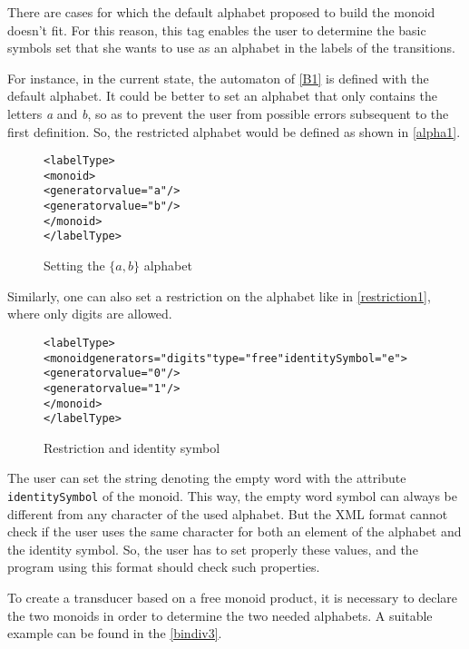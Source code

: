 \documentclass[a4paper]{article}
\newcommand{\xattr}[1]{\texttt{#1}}
\begin{document}
There are cases for which the default alphabet proposed to build the
monoid doesn't fit. For this reason, this tag enables the user to
determine the basic symbols set that she wants to use as an alphabet
in the labels of the transitions.

For instance, in the current state, the automaton of \autoref{B1} is
defined with the default alphabet. It could be better to set an
alphabet that only contains the letters \textit{a} and \textit{b}, so
as to prevent the user from possible errors subsequent to the first
definition. So, the restricted alphabet would be defined as shown in
\autoref{alpha1}.

\begin{figure}[ht]
  \small
  \begin{center}
\begin{alltt}
<labelType>
  <monoid>
     <generator value="a"/>
     <generator value="b"/>
  </monoid>
</labelType>
\end{alltt}

\caption{Setting the $\{a, b\}$ alphabet}
\label{alpha1}
  \end{center}
\end{figure}

Similarly, one can also set a restriction on the alphabet like in
\autoref{restriction1}, where only digits are allowed.

\begin{figure}[ht]
  \small
  \begin{center}
\begin{alltt}
<labelType>
  <monoid generators="digits" type="free" identitySymbol="e">
    <generator value="0"/>
    <generator value="1"/>
  </monoid>
</labelType>
\end{alltt}

\caption{Restriction and identity symbol}
\label{restriction1}
  \end{center}
\end{figure}


The user can set the string denoting the empty word with the attribute
\xattr{identitySymbol} of the monoid. This way, the empty word
symbol can always be different from any character of the used
alphabet. But the XML format cannot check if the user uses the same character
for both an element of the alphabet and the identity symbol. So, the user has
to set properly these values, and the program using this format should check
such properties.

To create a transducer based on a free monoid product, it is necessary
to declare the two monoids in order to determine the two needed
alphabets. A suitable example can be found in the
\autoref{bindiv3}.
\end{document}
